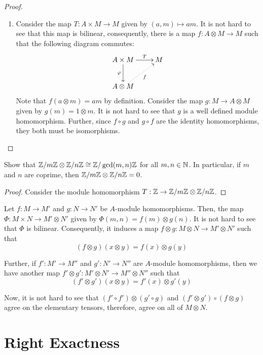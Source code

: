 \begin{proof}
\begin{enumerate}[label=(\alph*)]
\item Consider the map $T: A\times M\to M$ given by $(a,m)\mapsto am$. It is not hard to see that this map is bilinear, consequently, there is a map $f: A\otimes M\to M$ such that the following diagram commutes: 
\begin{equation*}
\xymatrix {
    A\times M\ar[r]^-T\ar[d]_\varphi & M\\
    A\otimes M\ar@{.>}[ru]_-{f}
}
\end{equation*}
Note that $f(a\otimes m) = am$ by definition. Consider the map $g: M\to A\otimes M$ given by $g(m) = 1\otimes m$. It is not hard to see that $g$ is a well defined module homomorphism. Further, since $f\circ g$ and $g\circ f$ are the identity homomorphisms, they both must be isomorphisms.
\end{enumerate}
\end{proof}

\begin{example}
    Show that $\mathbb{Z}/m\mathbb{Z}\otimes\mathbb{Z}/n\mathbb{Z}\cong\mathbb{Z}/\gcd(m,n)\mathbb{Z}$ for all $m,n\in\mathbb{N}$. In particular, if $m$ and $n$ are coprime, then $\mathbb{Z}/m\mathbb{Z}\otimes\mathbb{Z}/n\mathbb{Z} = 0$.
\end{example}
\begin{proof}
    Consider the module homomorphism $T:\mathbb{Z}\to\mathbb{Z}/m\mathbb{Z}\otimes\mathbb{Z}/n\mathbb{Z}$. 
\end{proof}

Let $f: M\to M'$ and $g: N\to N'$ be $A$-module homomorphisms. Then, the map $\Phi: M\times N\to M'\otimes N'$ given by $\Phi(m,n) = f(m)\otimes g(n)$. It is not hard to see that $\Phi$ is bilinear. Consequently, it induces a map $f\otimes g: M\otimes N\to M'\otimes N'$ such that 
\begin{equation*}
    (f\otimes g)(x\otimes y) = f(x)\otimes g(y)
\end{equation*}

Further, if $f': M'\to M''$ and $g': N'\to N''$ are $A$-module homomorphisms, then we have another map $f'\otimes g': M'\otimes N'\to M''\otimes N''$ such that 
\begin{equation*}
    (f'\otimes g')(x\otimes y) = f'(x)\otimes g'(y)
\end{equation*}

Now, it is not hard to see that $(f'\circ f')\otimes(g'\circ g)$ and $(f'\otimes g')\circ(f\otimes g)$ agree on the elementary tensors, therefore, agree on all of $M\otimes N$.

\section{Right Exactness}

